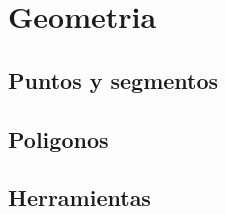 \documentclass[twocolumn]{article}
\begin{document}
	\section{Geometria}
	\subsection{Puntos y segmentos}
	
	
	
	
	
	

	\subsection{Poligonos}
	
	
	
	

	\subsection{Herramientas}
	
	
	
	

\end{document}
